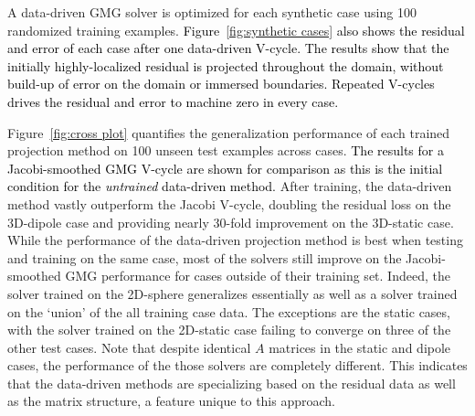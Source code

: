 \documentclass[]{elsarticle}
\begin{document}
A data-driven GMG solver is optimized for each synthetic case using 100 randomized training examples. \textcolor{black}{Figure~\ref{fig:synthetic cases} also shows the residual and error of each case after one data-driven V-cycle. The results show that the initially highly-localized residual is projected throughout the domain, without build-up of error on the domain or immersed boundaries. Repeated V-cycles drives the residual and error to machine zero in every case.} 

Figure~\ref{fig:cross plot} quantifies the generalization performance of each trained projection method on 100 unseen test examples across cases. \textcolor{black}{The results for a Jacobi-smoothed GMG V-cycle are shown for comparison as this is the initial condition for the \textit{untrained} data-driven method.} After training, the data-driven method vastly outperform the Jacobi V-cycle, doubling the residual loss on the 3D-dipole case and providing nearly 30-fold improvement on the 3D-static case. While the performance of the data-driven projection method is best when testing and training on the same case, most of the solvers still improve on the Jacobi-smoothed GMG performance for cases outside of their training set. Indeed, the solver trained on the 2D-sphere generalizes essentially as well as a solver trained on the `union' of the all training case data. The exceptions are the static cases, with the solver trained on the 2D-static case failing to converge on three of the other test cases. Note that despite identical $A$ matrices in the static and dipole cases, the performance of the those solvers are completely different. This indicates that the data-driven methods are specializing based on the residual data as well as the matrix structure, a feature unique to this approach.
\end{document}
